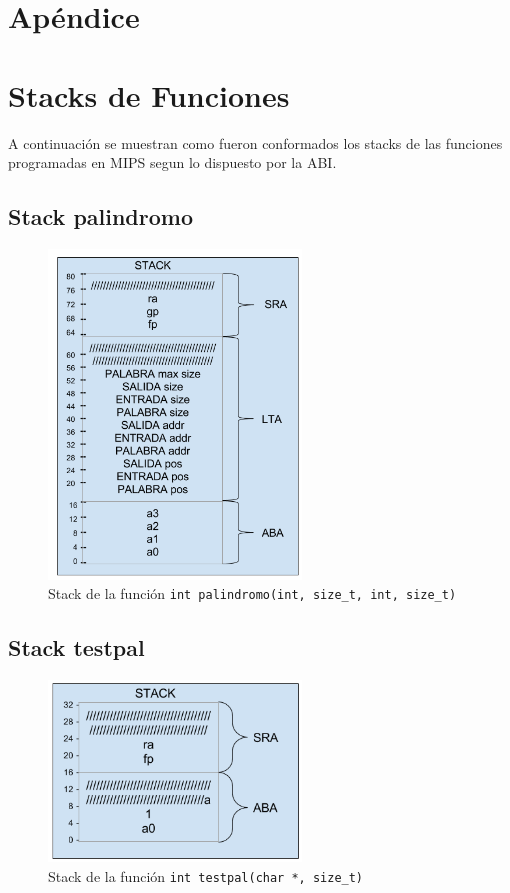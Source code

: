 \documentclass[11pt,a4paper]{article}
\begin{document}
\appendix

\section*{Apéndice}

\section{Stacks de Funciones}
A continuación se muestran como fueron conformados los stacks de las funciones programadas en MIPS segun lo dispuesto por la ABI.

\subsection{Stack palindromo}
\begin{figure}[H]
	\centering	
	\includegraphics[width=0.6\textwidth]{stack_palindromo}
	\caption{Stack de la función \texttt{int palindromo(int, size\_t, int, size\_t)}}
\end{figure}

\subsection{Stack testpal}
\begin{figure}[H]
	\centering	
	\includegraphics[width=0.6\textwidth]{stack_testpal}
	\caption{Stack de la función \texttt{int testpal(char *, size\_t)}}
\end{figure}
\end{document}
